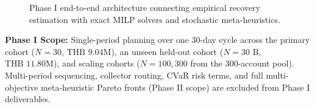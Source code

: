 \documentclass[10pt,a4paper]{article}
\begin{document}
\begin{figure}[!ht]
\caption{Phase I end-to-end architecture connecting empirical recovery estimation with exact MILP solvers and stochastic meta-heuristics.}
\label{fig:workflow}
\end{figure}

\textbf{Phase I Scope:} Single-period planning over one 30-day cycle across the primary cohort ($N=30$, $\text{THB~}9.04\text{M}$), an unseen held-out cohort ($N=30\text{ B}$, $\text{THB~}11.80\text{M}$), and scaling cohorts ($N=100, 300$ from the 300-account pool). Multi-period sequencing, collector routing, CVaR risk terms, and full multi-objective meta-heuristic Pareto fronts (Phase II scope) are excluded from Phase I deliverables.
\end{document}
